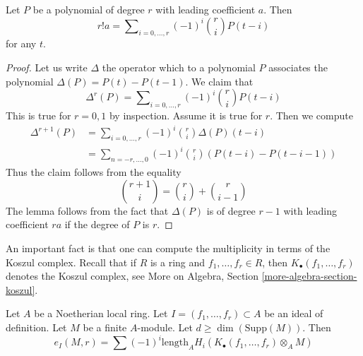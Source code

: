 \begin{lemma}
\label{lemma-leading-coefficient}
Let $P$ be a polynomial of degree $r$ with leading coefficient $a$.
Then
$$
r! a = \sum\nolimits_{i = 0, \ldots, r} (-1)^i{r \choose i} P(t - i)
$$
for any $t$.
\end{lemma}

\begin{proof}
Let us write $\Delta$ the operator which to a polynomial $P$ associates
the polynomial $\Delta(P) = P(t) - P(t - 1)$. We claim that
$$
\Delta^r(P) = \sum\nolimits_{i = 0, \ldots, r} (-1)^i {r \choose i} P(t - i)
$$
This is true for $r = 0, 1$ by inspection. Assume it is true for $r$.
Then we compute
\begin{align*}
\Delta^{r + 1}(P)
& =
\sum\nolimits_{i = 0, \ldots, r} (-1)^i {r \choose i} \Delta(P)(t - i) \\
& =
\sum\nolimits_{n = -r, \ldots, 0} (-1)^i {r \choose i}
(P(t - i) - P(t - i - 1))
\end{align*}
Thus the claim follows from the equality
$$
{r + 1 \choose i} = {r \choose i} + {r \choose i - 1}
$$
The lemma follows from the fact that $\Delta(P)$ is of degree $r - 1$
with leading coefficient $ra$ if the degree of $P$ is $r$.
\end{proof}

\noindent
An important fact is that one can compute the multiplicity in terms
of the Koszul complex. Recall that if $R$ is a ring and
$f_1, \ldots, f_r \in R$, then $K_\bullet(f_1, \ldots, f_r)$
denotes the Koszul complex, see
More on Algebra, Section \ref{more-algebra-section-koszul}.

\begin{theorem}
\label{theorem-multiplicity-with-koszul}
\begin{reference}
\cite[Theorem 1 in part B of Chapter IV]{Serre_algebre_locale}
\end{reference}
Let $A$ be a Noetherian local ring. Let $I = (f_1, \ldots, f_r) \subset A$
be an ideal of definition. Let $M$ be a finite $A$-module. Let
$d \geq \dim(\text{Supp}(M))$. Then
$$
e_I(M, r) = \sum
(-1)^i\text{length}_A H_i(K_\bullet(f_1, \ldots, f_r) \otimes_A M)
$$
\end{theorem}

